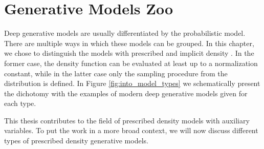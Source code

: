 \section{Generative Models Zoo}\label{sec:gen_zoo}
Deep generative models are usually differentiated by the probabilistic model. 
There are multiple ways in which these models can be grouped. In this chapter, we chose to distinguish the models with prescribed and implicit density \citep{diggle1984monte}. In the former case, the density function can be evaluated at least up to a normalization constant, while in the latter case only the sampling procedure from the distribution is defined. 
In Figure \ref{fig:into_model_types} we schematically present the dichotomy with the examples of modern deep generative models given for each type.

This thesis contributes to the field of prescribed density models with auxiliary variables. To put the work in a more broad context, we will now discuss different types of prescribed density generative models.


